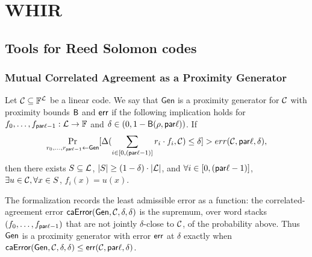 
\section{WHIR}

\subsection{Tools for Reed Solomon codes}

\subsubsection{Mutual Correlated Agreement as a Proximity Generator}

\begin{definition}\label{def:proximity_generator}
\leanok
{}
Let $\mathcal{C}\subseteq \mathbb{F}^{\mathcal{L}}$ be a linear code. We say that $\mathsf{Gen}$ is a proximity generator for $\mathcal{C}$ with proximity bounds ${\mathsf{B}}$ and $\mathsf{err}$ if the following implication holds for $f_0,\ldots,f_{\mathsf{par}\ell-1} : \mathcal{L} \rightarrow \mathbb{F}$ and $\delta\in(0,1-{\mathsf{B}}(\rho,\mathsf{par}\ell))$. If
\begin{align*}
    \Pr_{r_0,\ldots,r_{\mathsf{par}\ell-1}\leftarrow \mathsf{Gen}}[\Delta(\sum_{i\in[0,(\mathsf{par}\ell-1)]} r_i \cdot f_i, \mathcal{C}) \le \delta] > err(\mathcal{C},\mathsf{par}\ell,\delta),
\end{align*}
then there exists $S\subseteq \mathcal{L}$, $|S|\ge(1-\delta)\cdot|\mathcal{L}|$, and
$\forall i \in [0, (\mathsf{par}\ell-1)]$, $\exists u \in \mathcal{C}, \forall x \in S$, $f_i(x)=u(x)$.

The formalization records the least admissible error as a function: the correlated-agreement
error $\mathsf{caError}(\mathsf{Gen},\mathcal{C},\delta,\delta)$ is the supremum, over word stacks
$(f_0,\ldots,f_{\mathsf{par}\ell-1})$ that are not jointly $\delta$-close to $\mathcal{C}$, of the probability
above. Thus $\mathsf{Gen}$ is a proximity generator with error $\mathsf{err}$ at $\delta$ exactly when
$\mathsf{caError}(\mathsf{Gen},\mathcal{C},\delta,\delta)\le\mathsf{err}(\mathcal{C},\mathsf{par}\ell,\delta)$.
\end{definition}

